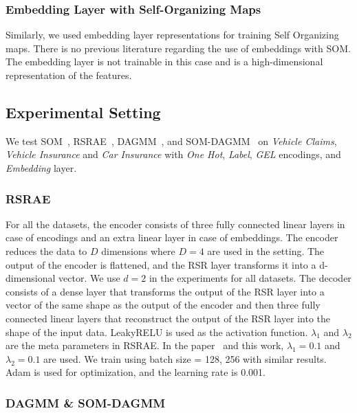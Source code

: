 \documentclass{article}
\begin{document}
\subsubsection{Embedding Layer with Self-Organizing Maps}

Similarly, we used embedding layer representations for training Self Organizing maps. There is no previous literature regarding the use of embeddings with SOM. The embedding layer is not trainable in this case and is a high-dimensional representation of the features. 

\subsection{Experimental Setting}\label{a5}


We test SOM~\citep{som}, RSRAE~\citep{rsrae}, DAGMM~\citep{dagmm}, and SOM-DAGMM~\citep{som} on \textit{Vehicle Claims}, \textit{Vehicle Insurance} and \textit{Car Insurance} with \textit{One Hot}, \textit{Label}, \textit{GEL} encodings, and \textit{Embedding} layer. 

\subsubsection{RSRAE}
 For all the datasets, the encoder consists of three fully connected linear layers in case of encodings and an extra linear layer in case of embeddings. The encoder reduces the data to $D$ dimensions where  $D = 4$  are used in the setting. The output of the encoder is flattened, and the RSR layer transforms it into a d-dimensional vector. We use $d= 2 $ in the experiments for all datasets. The decoder consists of a dense layer that transforms the output of the RSR layer into a vector of the same shape as the output of the encoder and then three fully connected linear layers that reconstruct the output of the RSR layer into the shape of the input data. LeakyRELU is used as the activation function. 
$\lambda_{1}$ and $\lambda_{2}$ are the meta parameters in RSRAE. In the paper~\citep{rsrae} and this work, $\lambda_{1}=0.1$ and $\lambda_{2}=0.1$ are used. We train using batch size = {128, 256} with similar results. Adam is used for optimization, and the learning rate is 0.001. 

\subsubsection{DAGMM \& SOM-DAGMM}
\end{document}
